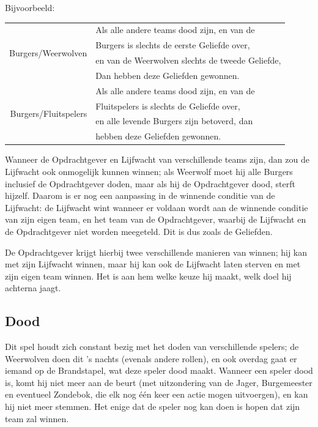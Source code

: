 \documentclass[12pt]{article}
\begin{document}
    Bijvoorbeeld:

    \begin{center}
      \begin{tabular}{r|l}
	\multirow{4}{*}{Burgers/Weerwolven}
	 & Als alle andere teams dood zijn, en van de \\
	 & Burgers is slechts de eerste Geliefde over, \\
	 & en van de Weerwolven slechts de tweede Geliefde, \\
	 & Dan hebben deze Geliefden gewonnen.\\
	\hline
	\multirow{4}{*}{Burgers/Fluitspelers}
	 & Als alle andere teams dood zijn, en van de \\
	 & Fluitspelers is slechts de Geliefde over, \\
	 & en alle levende Burgers zijn betoverd, dan \\
	 & hebben deze Geliefden gewonnen. \\
      \end{tabular}
    \end{center}
    
    Wanneer de Opdrachtgever en Lijfwacht van verschillende teams zijn, dan zou de Lijfwacht ook onmogelijk kunnen winnen; als Weerwolf moet hij alle Burgers inclusief de Opdrachtgever doden, maar als hij de Opdrachtgever dood, sterft hijzelf. Daarom is er nog een aanpassing in de winnende conditie van de Lijfwacht: de Lijfwacht wint wanneer er voldaan wordt aan de winnende conditie van zijn eigen team, en het team van de Opdrachtgever, waarbij de Lijfwacht en de Opdrachtgever niet worden meegeteld. Dit is dus zoals de Geliefden.
    
    De Opdrachtgever krijgt hierbij twee verschillende manieren van winnen; hij kan met zijn Lijfwacht winnen, maar hij kan ook de Lijfwacht laten sterven en met zijn eigen team winnen. Het is aan hem welke keuze hij maakt, welk doel hij achterna jaagt.
    
  \subsection{Dood}
  
    Dit spel houdt zich constant bezig met het doden van verschillende spelers; de Weerwolven doen dit 's nachts (evenals andere rollen), en ook overdag gaat er iemand op de Brandstapel, wat deze speler dood maakt. Wanneer een speler dood is, komt hij niet meer aan de beurt (met uitzondering van de Jager, Burgemeester en eventueel Zondebok, die elk nog \'e\'en keer een actie mogen uitvoergen), en kan hij niet meer stemmen. Het enige dat de speler nog kan doen is hopen dat zijn team zal winnen.
    
\end{document}
